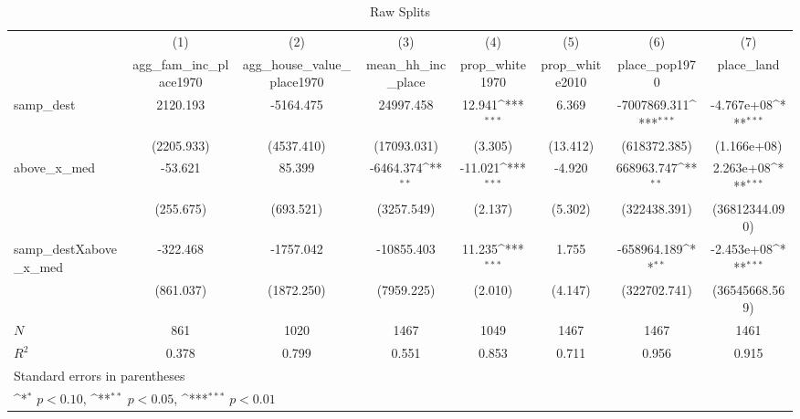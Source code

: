 \begin{table}[htbp]\centering
\def\sym#1{\ifmmode^{#1}\else\(^{#1}\)\fi}
\caption{Raw Splits}
\begin{tabular}{l*{7}{c}}
\hline\hline
            &\multicolumn{1}{c}{(1)}&\multicolumn{1}{c}{(2)}&\multicolumn{1}{c}{(3)}&\multicolumn{1}{c}{(4)}&\multicolumn{1}{c}{(5)}&\multicolumn{1}{c}{(6)}&\multicolumn{1}{c}{(7)}\\
            &\multicolumn{1}{c}{agg\_fam\_inc\_place1970}&\multicolumn{1}{c}{agg\_house\_value\_place1970}&\multicolumn{1}{c}{mean\_hh\_inc\_place}&\multicolumn{1}{c}{prop\_white1970}&\multicolumn{1}{c}{prop\_white2010}&\multicolumn{1}{c}{place\_pop1970}&\multicolumn{1}{c}{place\_land}\\
\hline
samp\_dest   &    2120.193         &   -5164.475         &   24997.458         &      12.941\sym{***}&       6.369         &-7007869.311\sym{***}&  -4.767e+08\sym{***}\\
            &  (2205.933)         &  (4537.410)         & (17093.031)         &     (3.305)         &    (13.412)         &(618372.385)         & (1.166e+08)         \\
[1em]
above\_x\_med &     -53.621         &      85.399         &   -6464.374\sym{**} &     -11.021\sym{***}&      -4.920         &  668963.747\sym{**} &   2.263e+08\sym{***}\\
            &   (255.675)         &   (693.521)         &  (3257.549)         &     (2.137)         &     (5.302)         &(322438.391)         &(36812344.090)         \\
[1em]
samp\_destXabove\_x\_med&    -322.468         &   -1757.042         &  -10855.403         &      11.235\sym{***}&       1.755         & -658964.189\sym{**} &  -2.453e+08\sym{***}\\
            &   (861.037)         &  (1872.250)         &  (7959.225)         &     (2.010)         &     (4.147)         &(322702.741)         &(36545668.569)         \\
\hline
\(N\)       &         861         &        1020         &        1467         &        1049         &        1467         &        1467         &        1461         \\
\(R^{2}\)   &       0.378         &       0.799         &       0.551         &       0.853         &       0.711         &       0.956         &       0.915         \\
\hline\hline
\multicolumn{8}{l}{\footnotesize Standard errors in parentheses}\\
\multicolumn{8}{l}{\footnotesize \sym{*} \(p<0.10\), \sym{**} \(p<0.05\), \sym{***} \(p<0.01\)}\\
\end{tabular}
\end{table}
